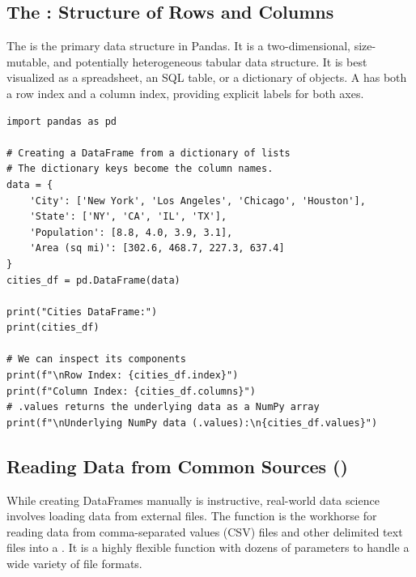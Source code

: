 \subsection{The : Structure of Rows and Columns}
\label{subsec:pandas_dataframe}
The  is the primary data structure in Pandas. It is a two-dimensional, size-mutable, and potentially heterogeneous tabular data structure. It is best visualized as a spreadsheet, an SQL table, or a dictionary of  objects. A  has both a row index and a column index, providing explicit labels for both axes.

\text{ }\begin{verbatim}
import pandas as pd

# Creating a DataFrame from a dictionary of lists
# The dictionary keys become the column names.
data = {
    'City': ['New York', 'Los Angeles', 'Chicago', 'Houston'],
    'State': ['NY', 'CA', 'IL', 'TX'],
    'Population': [8.8, 4.0, 3.9, 3.1],
    'Area (sq mi)': [302.6, 468.7, 227.3, 637.4]
}
cities_df = pd.DataFrame(data)

print("Cities DataFrame:")
print(cities_df)

# We can inspect its components
print(f"\nRow Index: {cities_df.index}")
print(f"Column Index: {cities_df.columns}")
# .values returns the underlying data as a NumPy array
print(f"\nUnderlying NumPy data (.values):\n{cities_df.values}")
\end{verbatim}


\subsection{Reading Data from Common Sources ()}
\label{subsec:pandas_read_csv}
While creating DataFrames manually is instructive, real-world data science involves loading data from external files. The  function is the workhorse for reading data from comma-separated values (CSV) files and other delimited text files into a . It is a highly flexible function with dozens of parameters to handle a wide variety of file formats.

